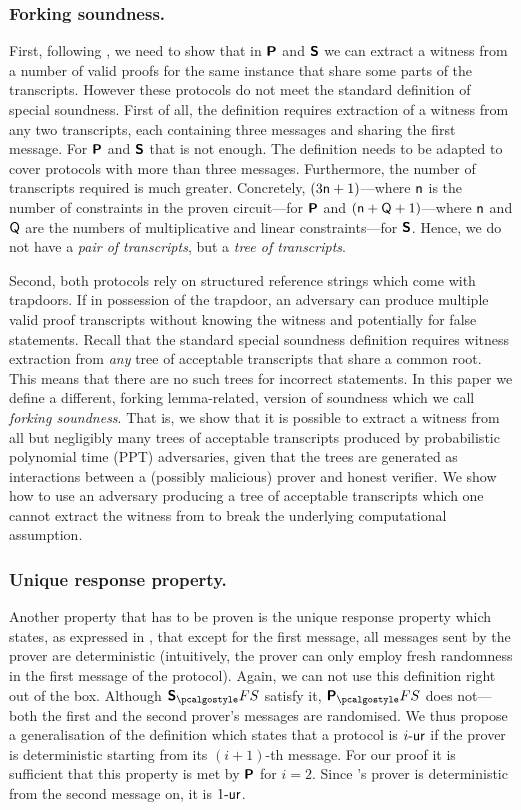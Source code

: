 \documentclass[runningheads,10pt]{llncs}
\begin{document}
\subsubsection{Forking soundness.} 
First, following \cite{INDOCRYPT:FKMV12}, we need to show that in $\bm{\mathsf{P}}$
and $\bm{\mathsf{S}}$ we can extract a witness from a number of valid proofs for the
same instance that share some parts of the transcripts. However these protocols
do not meet the standard definition of special soundness. First of all, the
definition requires extraction of a witness from any two transcripts, each
containing three messages and sharing the first message. For $\bm{\mathsf{P}}$ and
$\bm{\mathsf{S}}$ that is not enough. The definition needs to be adapted to cover
protocols with more than three messages. Furthermore, the number of transcripts
required is much greater. Concretely, $(3 \mathsf{n} + 1)$---where $\mathsf{n}$ is the
number of constraints in the proven circuit---for $\bm{\mathsf{P}}$ and
$(\mathsf{n} + \mathsf{Q} + 1)$---where $\mathsf{n}$ and $\mathsf{Q}$ are the
numbers of multiplicative and linear constraints---for $\bm{\mathsf{S}}$. Hence, we
do not have a \emph{pair of transcripts}, but a \emph{tree of transcripts}.

Second, both protocols rely on structured reference strings which come with
trapdoors. If in possession of the trapdoor, an adversary can produce multiple
valid proof transcripts without knowing the witness and potentially for false
statements. Recall that the standard special soundness definition requires
witness extraction from \emph{any} tree of acceptable transcripts that share a
common root. This means that there are no such trees for incorrect
statements. In this paper we define a different, forking lemma-related, version
of soundness which we call \emph{forking soundness}. That is, we show that it is
possible to extract a witness from all but negligibly many trees of acceptable
transcripts produced by probabilistic polynomial time (PPT) adversaries, given
that the trees are generated as interactions between a (possibly malicious)
prover and honest verifier. We show how to use an adversary producing a tree of
acceptable transcripts which one cannot extract the witness from to break the
underlying computational assumption.

\subsubsection{Unique response property.}%
Another property that has to be proven is the unique response property which
states, as expressed in \cite{C:Fischlin05}, that except for the first message,
all messages sent by the prover are deterministic (intuitively, the prover can
only employ fresh randomness in the first message of the protocol). Again, we
can not use this definition right out of the box. Although $\sonicprotfs$
satisfy it, $\plonkprotfs$ does not---both the first and the second prover's
messages are randomised. We thus propose a generalisation of the definition
which states that a protocol is ${i\text{-}\mathsf{ur}}$ if the prover is deterministic starting
from its $(i + 1)$-th message. For our proof it is sufficient that this property
is met by $\bm{\mathsf{P}}$ for $i = 2$. Since \sonic{}'s prover is deterministic
from the second message on, it is ${1\text{-}\mathsf{ur}}$.
\end{document}
